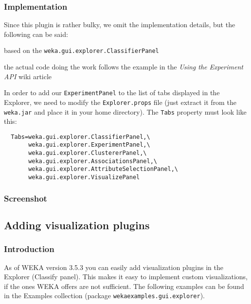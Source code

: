 \subsubsection*{Implementation}
\begin{tight_itemize}
  \item Since this plugin is rather bulky, we omit the implementation details,
but the following can be said:
  \begin{tight_itemize}
	\item based on the \texttt{weka.gui.explorer.ClassifierPanel}
	\item the actual code doing the work follows the example in the
\textit{Using the Experiment API} wiki article \cite{wekawiki}
  \end{tight_itemize}
  \item In order to add our \texttt{ExperimentPanel} to the list of tabs
displayed in the Explorer, we need to modify the \texttt{Explorer.props} file
(just extract it from the \texttt{weka.jar} and place it in your home
directory). The \texttt{Tabs} property must look like this:
  \begin{verbatim}
  Tabs=weka.gui.explorer.ClassifierPanel,\
       weka.gui.explorer.ExperimentPanel,\
       weka.gui.explorer.ClustererPanel,\
       weka.gui.explorer.AssociationsPanel,\
       weka.gui.explorer.AttributeSelectionPanel,\
       weka.gui.explorer.VisualizePanel
  \end{verbatim}
\end{tight_itemize}

\subsubsection*{Screenshot}
\begin{center}
\end{center}

\newpage
\subsection{Adding visualization plugins}
\subsubsection*{Introduction}
As of WEKA version 3.5.3 you can easily add visualization plugins in the
Explorer (Classify panel). This makes it easy to implement custom
visualizations, if the ones WEKA offers are not sufficient. The following
examples can be found in the Examples collection \cite{wekaexamples} (package
\texttt{wekaexamples.gui.explorer}).

